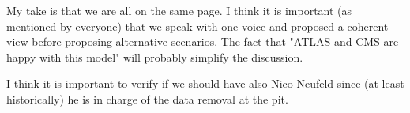 \documentclass{lhcb+cta}
\begin{document}
My take is that we are all on the same page. I think it is important (as mentioned by everyone) that we speak with one voice and proposed a coherent view before proposing alternative scenarios. The fact that "ATLAS and CMS are happy with this model" will probably simplify the discussion.

I think it is important to verify if we should have also Nico Neufeld since (at least historically) he is in charge of the data removal at the pit.
\end{document}
